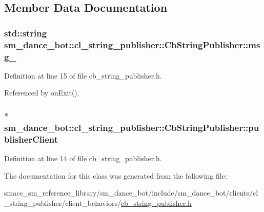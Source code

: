 \subsection{Member Data Documentation}
\subsubsection[{\texorpdfstring{msg\+\_\+}{msg_}}]{\setlength{\rightskip}{0pt plus 5cm}std\+::string sm\+\_\+dance\+\_\+bot\+::cl\+\_\+string\+\_\+publisher\+::\+Cb\+String\+Publisher\+::msg\+\_\+}\hypertarget{classsm__dance__bot_1_1cl__string__publisher_1_1CbStringPublisher_a320ff6940dc15b469af3679d2d2eb655}{}\label{classsm__dance__bot_1_1cl__string__publisher_1_1CbStringPublisher_a320ff6940dc15b469af3679d2d2eb655}


Definition at line 15 of file cb\+\_\+string\+\_\+publisher.\+h.



Referenced by on\+Exit().

\subsubsection[{\texorpdfstring{publisher\+Client\+\_\+}{publisherClient_}}]{$\ast$ sm\+\_\+dance\+\_\+bot\+::cl\+\_\+string\+\_\+publisher\+::\+Cb\+String\+Publisher\+::publisher\+Client\+\_\+}\hypertarget{classsm__dance__bot_1_1cl__string__publisher_1_1CbStringPublisher_aafcad6e6296a3088cb91ffeb22025bd6}{}\label{classsm__dance__bot_1_1cl__string__publisher_1_1CbStringPublisher_aafcad6e6296a3088cb91ffeb22025bd6}


Definition at line 14 of file cb\+\_\+string\+\_\+publisher.\+h.



The documentation for this class was generated from the following file\+:\begin{DoxyCompactItemize}
\item 
smacc\+\_\+sm\+\_\+reference\+\_\+library/sm\+\_\+dance\+\_\+bot/include/sm\+\_\+dance\+\_\+bot/clients/cl\+\_\+string\+\_\+publisher/client\+\_\+behaviors/\hyperlink{cb__string__publisher_8h}{cb\+\_\+string\+\_\+publisher.\+h}\end{DoxyCompactItemize}
